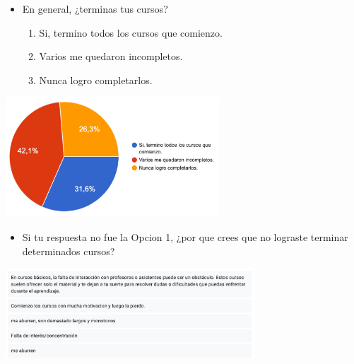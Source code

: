 \documentclass[
]{article}
\providecommand{\tightlist}{%
  \setlength{\itemsep}{0pt}\setlength{\parskip}{0pt}}
\begin{document}
\begin{itemize}
\tightlist
\item
  En general, ¿terminas tus cursos?

  \begin{enumerate}
  \def\labelenumi{\alph{enumi}.}
  \tightlist
  \item
    Si, termino todos los cursos que comienzo.
  \item
    Varios me quedaron incompletos.
  \item
    Nunca logro completarlos.
  \end{enumerate}
\end{itemize}

\includegraphics[width=0.6\textwidth,height=\textheight]{img/terminar.png}

\newpage

\begin{itemize}
\tightlist
\item
  Si tu respuesta no fue la Opcion 1, ¿por que crees que no lograste
  terminar determinados cursos?
\end{itemize}

\includegraphics[width=0.7\textwidth,height=\textheight]{img/porque.png}

\vspace{10mm}
\end{document}
